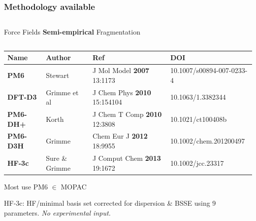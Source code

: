 \begin{frame}[fragile]

    \frametitle{Methodology available}

    \begin{columns}[t]
        \centering
        Force Fields
        \centering
        {\bf Semi-empirical}
        \centering
        Fragmentation
    \end{columns}

    \bigskip
    \bigskip

{
    \scriptsize

    \begin{tabular*}{\linewidth}{ @{} l l l l @{} }
        Name & Author & Ref & DOI \\
        \midrule
        {\bf PM6} & Stewart            & J Mol Model {\bf 2007} 13:1173 & 10.1007/s00894-007-0233-4 \\
     {\bf DFT-D3} & Grimme {et al}     & J Chem Phys {\bf 2010} 15:154104 & 10.1063/1.3382344 \\
    {\bf PM6-DH+} & Korth              & J Chem T Comp {\bf 2010} 12:3808 & 10.1021/ct100408b \\
    {\bf PM6-D3H} & Grimme             & Chem Eur J  {\bf 2012} 18:9955 & 10.1002/chem.201200497 \\
      {\bf HF-3c} & Sure \& Grimme     & J Comput Chem {\bf 2013} 19:1672 &  10.1002/jcc.23317 \\

    \end{tabular*}
}
    \small

    \bigskip

    Most use PM6 $\in$ MOPAC

    \bigskip

    HF-3c: HF/minimal basis set corrected for dispersion \& BSSE using 9 parameters. {\em No experimental input. }

\end{frame}


